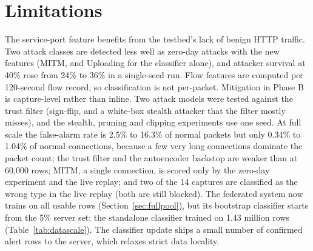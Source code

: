 \section*{Limitations}
The service-port feature benefits from the testbed's lack of benign HTTP traffic. Two attack classes are detected less well as zero-day attacks with the new features (MITM, and Uploading for the classifier alone), and attacker survival at 40\% rose from 24\% to 36\% in a single-seed run. Flow features are computed per 120-second flow record, so classification is not per-packet. Mitigation in Phase B is capture-level rather than inline. Two attack models were tested against the trust filter (sign-flip, and a white-box stealth attacker that the filter mostly misses), and the stealth, pruning and clipping experiments use one seed. At full scale the false-alarm rate is 2.5\% to 16.3\% of normal packets but only 0.34\% to 1.04\% of normal connections, because a few very long connections dominate the packet count; the trust filter and the autoencoder backstop are weaker than at 60{,}000 rows; MITM, a single connection, is scored only by the zero-day experiment and the live replay; and two of the 14 captures are classified as the wrong type in the live replay (both are still blocked). The federated system now trains on all usable rows (Section~\ref{sec:fullpool}), but its bootstrap classifier starts from the 5\% server set; the standalone classifier trained on 1.43 million rows (Table~\ref{tab:datascale}). The classifier update ships a small number of confirmed alert rows to the server, which relaxes strict data locality.

